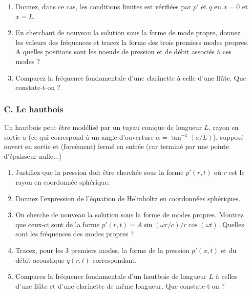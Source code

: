 \begin{enumerate}

\item Donnez, dans ce cas, les conditions limites est vérifiées par $p'$ et $q$ en $x=0$ et $x=L$.

\item En cherchant de nouveau la solution sous la forme de mode propre, 
donnez les valeurs des fréquences et tracez la forme des trois premiers modes propres. A quelles positions sont les noeuds de pression et de débit associés à ces modes ?

\item Comparez la fréquence fondamentale d'une clarinette à celle d'une flûte. Que constate-t-on ? 

\end{enumerate}


\subsubsection*{C. Le hautbois}

Un hautbois peut être modélisé par un tuyau conique de longueur $L$, rayon en sortie $a$
(ce qui correspond à un angle d'ouverture $\alpha = \tan^{-1}( a/L)$), supposé ouvert en sortie et (forcément) fermé en entrée (car terminé par une pointe d'épaisseur nulle...)

\begin{enumerate}

\item Justifiez que la pression doit être cherchée sous la forme $p'(r,t)$ où $r$ est le rayon en coordonnée sphérique.

\item Donnez l'expression de l'équation de Helmholtz en coordonnées sphériques.

\item On cherche de nouveau la solution sous la forme de modes propres. Montrez que ceux-ci sont de la forme $p'(r,t) = A \sin(\omega r/c )/r \cos ( \omega t)$. Quelles sont les fréquences des modes propres ? 

\item Tracez, pour les 3 premiers modes, la forme de la pression $p'(x,t)$ et du 
débit acoustique $q(r,t)$ correspondant. 

\item Comparez la fréquence fondamentale d'un hautbois de longueur $L$ à celles d'une flûte et d'une clarinette de même longueur. Que constate-t-on ?

\end{enumerate}
  


